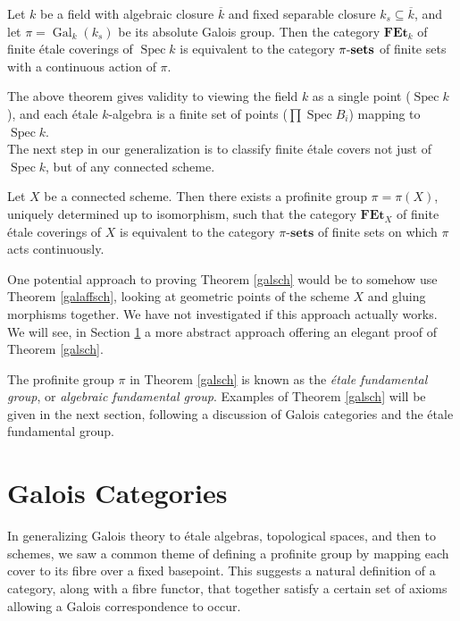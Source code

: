 \documentclass[11pt,openany]{book} %
\newcommand{\spc}{\operatorname{Spec}}
\newcommand{\xsets}[1]{#1\textnormal{-}\mathbf{sets}}
\begin{document}
\begin{theorem} \label{galaffsch}
Let $k$ be a field with algebraic closure $\overline{k}$ and fixed separable closure $k_s \subseteq \overline{k}$, and let $\pi = \operatorname{Gal}_k(k_s)$ be its absolute Galois group. Then the category $\mathbf{FEt}_k$ of finite \'etale coverings of $\spc k$ is equivalent to the category $\xsets{\pi}$ of finite sets with a continuous action of $\pi$.
\end{theorem}
\medskip

The above theorem gives validity to viewing the field $k$ as a single point ($\spc k$), and each \'etale $k$-algebra is a finite set of points ($\prod \spc B_i$) mapping to $\spc k$.\\

The next step in our generalization is to classify finite \'etale covers not just of $\spc k$, but of any connected scheme.\\

\begin{theorem} \label{galsch}
Let $X$ be a connected scheme. Then there exists a profinite group $\pi = \pi(X)$, uniquely determined up to isomorphism, such that the category $\mathbf{FEt}_X$ of finite \'etale coverings of $X$ is equivalent to the category $\pi$-$\mathbf{sets}$ of finite sets on which $\pi$ acts continuously.
\end{theorem}

\begin{remark}
One potential approach to proving Theorem \ref{galsch} would be to somehow use Theorem \ref{galaffsch}, looking at geometric points of the scheme $X$ and gluing morphisms together. We have not investigated if this approach actually works. We will see, in Section \ref{galcat} a more abstract approach offering an elegant proof of Theorem \ref{galsch}.
\end{remark}

The profinite group $\pi$ in Theorem \ref{galsch} is known as the \emph{\'etale fundamental group}, or \emph{algebraic fundamental group}. Examples of Theorem \ref{galsch} will be given in the next section, following a discussion of Galois categories and the \'etale fundamental group.

\section{Galois Categories} \label{galcat}

In generalizing Galois theory to \'etale algebras, topological spaces, and then to schemes, we saw a common theme of defining a profinite group by mapping each cover to its fibre over a fixed basepoint. This suggests a natural definition of a category, along with a fibre functor, that together satisfy a certain set of axioms allowing a Galois correspondence to occur.\\
\end{document}
